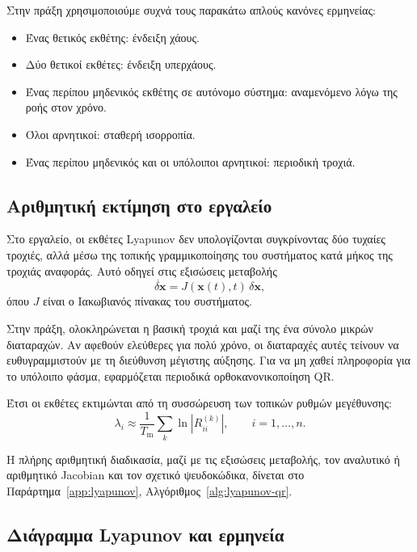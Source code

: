 \documentclass[11pt,a4paper]{report}
\begin{document}
Στην πράξη χρησιμοποιούμε συχνά τους παρακάτω απλούς κανόνες ερμηνείας:
\begin{itemize}
\item Ένας θετικός εκθέτης: ένδειξη χάους.
\item Δύο θετικοί εκθέτες: ένδειξη υπερχάους.
\item Ένας περίπου μηδενικός εκθέτης σε αυτόνομο σύστημα: αναμενόμενο λόγω της ροής στον χρόνο.
\item Όλοι αρνητικοί: σταθερή ισορροπία.
\item Ένας περίπου μηδενικός και οι υπόλοιποι αρνητικοί: περιοδική τροχιά.
\end{itemize}

\subsection{Αριθμητική εκτίμηση στο εργαλείο}
\label{subsec:lyapunov-numerical-simple}

Στο εργαλείο, οι εκθέτες Lyapunov δεν υπολογίζονται συγκρίνοντας δύο τυχαίες
τροχιές, αλλά μέσω της τοπικής γραμμικοποίησης του συστήματος κατά μήκος της
τροχιάς αναφοράς. Αυτό οδηγεί στις εξισώσεις μεταβολής
\begin{equation}
\dot{\delta\mathbf{x}} = J(\mathbf{x}(t),t)\,\delta\mathbf{x},
\end{equation}
όπου $J$ είναι ο Ιακωβιανός πίνακας του συστήματος.

Στην πράξη, ολοκληρώνεται η βασική τροχιά και μαζί της ένα σύνολο μικρών
διαταραχών. Αν αφεθούν ελεύθερες για πολύ χρόνο, οι διαταραχές αυτές τείνουν
να ευθυγραμμιστούν με τη διεύθυνση μέγιστης αύξησης. Για να μη χαθεί
πληροφορία για το υπόλοιπο φάσμα, εφαρμόζεται περιοδικά ορθοκανονικοποίηση QR.

Έτσι οι εκθέτες εκτιμώνται από τη συσσώρευση των τοπικών ρυθμών μεγέθυνσης:
\begin{equation}
\lambda_i \approx \frac{1}{T_{\mathrm{m}}}\sum_k \ln |R_{ii}^{(k)}|,
\qquad i=1,\dots,n.
\end{equation}

Η πλήρης αριθμητική διαδικασία, μαζί με τις εξισώσεις μεταβολής, τον
αναλυτικό ή αριθμητικό Jacobian και τον σχετικό ψευδοκώδικα, δίνεται στο
Παράρτημα~\ref{app:lyapunov}, Αλγόριθμος~\ref{alg:lyapunov-qr}.

\subsection{Διάγραμμα Lyapunov και ερμηνεία}
\label{subsec:lyapunov-diagram-simple}
\end{document}
